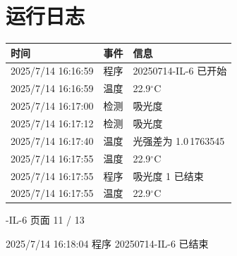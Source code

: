 \documentclass[UTF8,10pt,a4paper,fontset=fandol]{ctexart}
\newcommand{\fieldvalue}[1]{#1}
\begin{document}
\section*{运行日志}

\begin{tabularx}{\textwidth}{l l X}
时间 & 事件 & 信息\\
\hline
\fieldvalue{2025/7/14 16:16:59} &
程序 &
\fieldvalue{20250714-IL-6 已开始}\\
\fieldvalue{2025/7/14 16:16:59} &
温度 &
\fieldvalue{22.9$^\circ$C}\\
\fieldvalue{2025/7/14 16:17:00} &
检测 &
\fieldvalue{吸光度}\\
\fieldvalue{2025/7/14 16:17:12} &
检测 &
\fieldvalue{吸光度}\\
\fieldvalue{2025/7/14 16:17:40} &
温度 &
\fieldvalue{光强差为 1.0\,1763545}\\
\fieldvalue{2025/7/14 16:17:55} &
温度 &
\fieldvalue{22.9$^\circ$C}\\
\fieldvalue{2025/7/14 16:17:55} &
程序 &
\fieldvalue{吸光度 1 已结束}\\
\fieldvalue{2025/7/14 16:17:55} &
温度 &
\fieldvalue{22.9$^\circ$C}
\end{tabularx}


\newpage

-IL-6 \hfill 页面 11 / 13

\medskip

\noindent\small 2025/7/14 16:18:04 \quad 程序 20250714-IL-6 已结束
\end{document}
